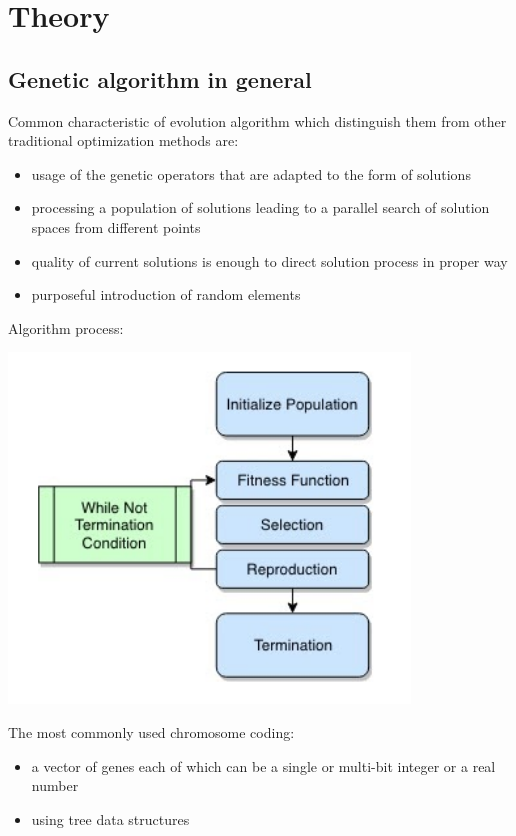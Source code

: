 \documentclass[a4paper, 12pt]{article}
\begin{document}
\section{Theory}

\subsection{Genetic algorithm in general}

Common characteristic of evolution algorithm which distinguish them from other traditional optimization methods are:	
\begin{itemize}
	\item usage of the genetic operators that are adapted to the form of solutions
	\item processing a population of solutions leading to a parallel search of solution spaces from different points
	\item quality of current solutions is enough to direct solution process in proper way
	\item purposeful introduction of random elements
\end{itemize}

Algorithm process:

\begin{center}
	\includegraphics[width=0.8\textwidth]{alg_loop.png} 
\end{center}

The most commonly used chromosome coding:
\begin{itemize}
	\item a vector of genes each of which can be a single or multi-bit integer or a real number
	\item using tree data structures
\end{itemize}
\end{document}
